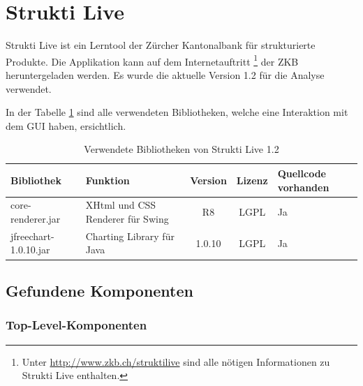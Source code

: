  \section{Strukti Live}
  
  Strukti Live ist ein Lerntool der Zürcher Kantonalbank für strukturierte
  Produkte. Die Applikation kann auf dem Internetauftritt \footnote{Unter 
  \url{http://www.zkb.ch/struktilive} sind alle nötigen Informationen zu Strukti
  Live enthalten.} der \ac{ZKB} heruntergeladen werden. Es wurde die aktuelle
  Version 1.2 für die Analyse verwendet.
  
  In der Tabelle \ref{tab:bibliothekenStruktiLive} sind alle verwendeten
  Bibliotheken, welche eine Interaktion mit dem \ac{GUI} haben, ersichtlich.
  \newline
  
  \begin{table}[ht]
    \sffamily 
    \begin{center}
      \begin{tabular}{lp{4.5cm}ccp{2cm}}
        \toprule
        \textbf{Bibliothek} & \textbf{Funktion} & \textbf{Version} &
        \textbf{Lizenz} & \textbf{Quellcode vorhanden}\\
        \midrule
        core-renderer.jar & XHtml und CSS Renderer für Swing & R8 & LGPL & Ja\\
        jfreechart-1.0.10.jar & Charting Library für Java & 1.0.10 & LGPL & Ja\\
        \bottomrule
      \end{tabular}
      \caption{Verwendete Bibliotheken von Strukti Live 1.2}
      \label{tab:bibliothekenStruktiLive}
    \end{center}
  \end{table}
  
  \subsection{Gefundene Komponenten}
  
  \subsubsection{Top-Level-Komponenten}
  
